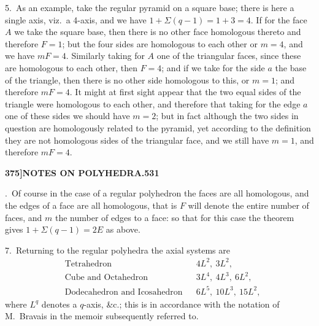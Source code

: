 \documentclass[11pt,a4paper]{article}
\begin{document}
5.~As an example, take the regular pyramid on a square base; there is here a single axis, viz.~a 4-axis, and we have $1 + \Sigma(q - 1) = 1 + 3 = 4$. If for the face $A$ we take the square base, then there is no other face homologous thereto and therefore $F = 1$; but the four sides are homologous to each other or $m = 4$, and we have $mF = 4$. Similarly taking for $A$ one of the triangular faces, since these are homologous to each other, then $F = 4$; and if we take for the side $a$ the base of the triangle, then there is no other side homologous to this, or $m = 1$; and therefore $mF = 4$. It might at first sight appear that the two equal sides of the triangle were homologous to each other, and therefore that taking for the edge $a$ one of these sides we should have $m = 2$; but in fact although the two sides in question are homologously related to the pyramid, yet according to the definition they are not homologous sides of the triangular face, and we still have $m = 1$, and therefore $mF = 4$.

\newpage
\begin{flushright}
\textbf{375]\hspace{1em}NOTES ON POLYHEDRA.\hfill531}
\end{flushright}

\vspace{12pt}

.~Of course in the case of a regular polyhedron the faces are all homologous, and the edges of a face are all homologous, that is $F$ will denote the entire number of faces, and $m$ the number of edges to a face: so that for this case the theorem gives $1 + \Sigma(q - 1) = 2E$ as above.

7.~Returning to the regular polyhedra the axial systems are
\begin{align*}
&\text{Tetrahedron} && 4L^{2},\ 3L^{2},\\
&\text{Cube and Octahedron} && 3L^{4},\ 4L^{3},\ 6L^{2},\\
&\text{Dodecahedron and Icosahedron} && 6L^{5},\ 10L^{3},\ 15L^{2},
\end{align*}
where $L^{q}$ denotes a $q$-axis, \&c.; this is in accordance with the notation of M.~Bravais in the memoir subsequently referred to.
\end{document}
